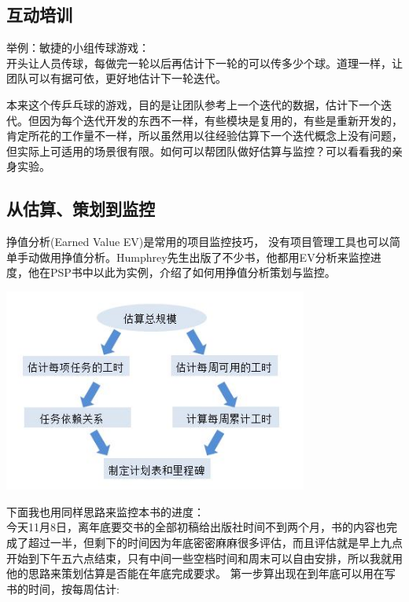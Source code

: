\hypertarget{ux4e92ux52a8ux57f9ux8bad}{%
\subsection{互动培训}\label{ux4e92ux52a8ux57f9ux8bad}}

举例：敏捷的小组传球游戏：\\
开头让人员传球，每做完一轮以后再估计下一轮的可以传多少个球。道理一样，让团队可以有据可依，更好地估计下一轮迭代。

本来这个传乒乓球的游戏，目的是让团队参考上一个迭代的数据，估计下一个迭代。但因为每个迭代开发的东西不一样，有些模块是复用的，有些是重新开发的，肯定所花的工作量不一样，所以虽然用以往经验估算下一个迭代概念上没有问题，但实际上可适用的场景很有限。如何可以帮团队做好估算与监控？可以看看我的亲身实验。

\hypertarget{ux4eceux4f30ux7b97ux7b56ux5212ux5230ux76d1ux63a7}{%
\subsection{从估算、策划到监控}\label{ux4eceux4f30ux7b97ux7b56ux5212ux5230ux76d1ux63a7}}

挣值分析(Earned Value EV)是常用的项目监控技巧，
没有项目管理工具也可以简单手动做用挣值分析。Humphrey先生出版了不少书，他都用EV分析来监控进度，他在PSP书中以此为实例，介绍了如何用挣值分析策划与监控。


\includegraphics[width=10cm]{PSPfig72.jpg}

下面我也用同样思路来监控本书的进度：\\


今天11月8日，离年底要交书的全部初稿给出版社时间不到两个月，书的内容也完成了超过一半，但剩下的时间因为年底密密麻麻很多评估，而且评估就是早上九点开始到下午五六点结束，只有中间一些空档时间和周末可以自由安排，所以我就用他的思路来策划估算是否能在年底完成要求。
第一步算出现在到年底可以用在写书的时间，按每周估计:

